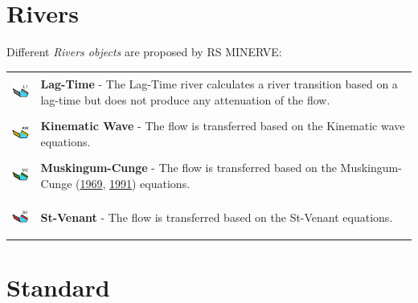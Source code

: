 \documentclass[
  letterpaper,
  DIV=11,
  numbers=noendperiod]{scrreprt}
\begin{document}
\hypertarget{sec-user_rainfall_runoff_rivers}{%
\chapter{Rivers}\label{sec-user_rainfall_runoff_rivers}}

Different \emph{Rivers objects} are proposed by RS MINERVE:

\begin{longtable}[]{@{}
  >{\raggedright\arraybackslash}p{}
  >{\raggedright\arraybackslash}p{}@{}}
\toprule()
\endhead
\includegraphics[width=0.44in,height=0.44in]{./figures/fig-icon_object_lagtime.png}
& \textbf{Lag-Time} - The Lag-Time river calculates a river transition
based on a lag-time but does not produce any attenuation of the flow. \\
\includegraphics[width=0.44in,height=0.44in]{./figures/fig-icon_object_kinem.png}
& \textbf{Kinematic Wave} - The flow is transferred based on the
Kinematic wave equations. \\
\includegraphics[width=0.44in,height=0.44in]{./figures/fig-icon_object_musking.png}
& \textbf{Muskingum-Cunge} - The flow is transferred based on the
Muskingum-Cunge (\protect\hyperlink{ref-cunge_subject_1969}{1969},
\protect\hyperlink{ref-cunge_polycopie_1991}{1991}) equations. \\
\includegraphics[width=0.44in,height=0.44in]{./figures/fig-icon_object_stvenant.png}
& \textbf{St-Venant} - The flow is transferred based on the St-Venant
equations. \\
\bottomrule()
\end{longtable}

\hypertarget{sec-user_rainfall_runoff_standard}{%
\chapter{Standard}\label{sec-user_rainfall_runoff_standard}}
\end{document}
